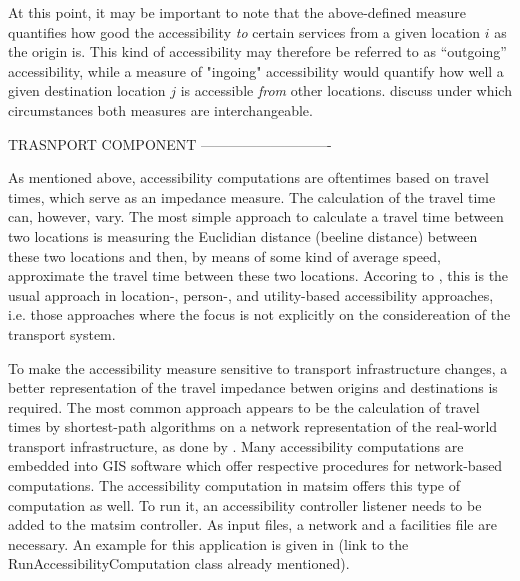 At this point, it may be important to note that the above-defined measure quantifies how good the accessibility \textit{to} certain services from a given location $i$ as the origin is. This kind of accessibility may therefore be referred to as ``outgoing'' accessibility, while a measure of "ingoing" accessibility would quantify how well a given destination location $j$ is accessible \textit{from} other locations. \citet{NicolaiNagel2012HiResAccessibilityMethodInBook} discuss under which circumstances both measures are interchangeable.

TRASNPORT COMPONENT ----------------------------


As mentioned above, accessibility computations are oftentimes based on travel times, which serve as an impedance measure. The calculation of the travel time can, however, vary. The most simple approach to calculate a travel time between two locations is measuring the Euclidian distance (beeline distance) between these two locations and then, by means of some kind of average speed, approximate the travel time between these two locations. Accoring to \citet{Geurs2004AccessibilityReview}, this is the usual approach in location-, person-, and utility-based accessibility approaches, i.e. those approaches where the focus is not explicitly on the considereation of the transport system.

To make the accessibility measure sensitive to transport infrastructure changes, a better representation of the travel impedance betwen origins and destinations is required. The most common approach appears to be the calculation of travel times by shortest-path algorithms on a network representation of the real-world transport infrastructure, as \eg done by \citet{BBSR20xxErreichbarkeitsmodell}.
Many accessibility computations are embedded into GIS software which offer respective procedures for network-based computations. The accessibility computation in \gls{matsim} offers this type of computation as well. To run it, an accessibility controller listener needs to be added to the \gls{matsim} controller. As input files, a network and a facilities file are necessary. An example for this application is given in (link to the RunAccessibilityComputation class already mentioned).

